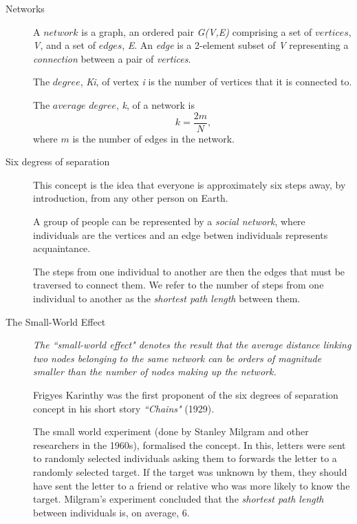 \documentclass[a4paper,11pt,titlepage]{article}
\begin{document}
\begin{description}
 \item [Networks] 

A \(network\) is a graph, an ordered pair \emph{G(V,E)} comprising a set of
\(vertices\), \emph{V}, and a set of \(edges\), \emph{E}. An \emph{edge} is a 
2-element subset of \emph{V} representing a \emph{connection} between a pair of \emph{vertices}. \cite{oconn11}

The \(degree\), \emph{K\lowercase{i}}, of vertex \emph{i} is the number of 
vertices that it is connected to.

The \(average\) \(degree\), \emph{k}, of a network is 
\begin{equation}
\ k =\frac{2m}{N} ,
\end{equation}
 where \(m\) is the number of edges in the network.

\item [Six degress of separation] 

This concept is the idea that everyone is approximately six steps away, by 
introduction, from any other person on Earth. 

A group of people can be represented by a \emph{social network}, where individuals are 
the vertices and an edge betwen individuals represents acquaintance. 

The steps from one individual to another are then the edges that must be 
traversed to connect them. We refer to the number of steps from one 
individual to another as the \emph{shortest path length} between them. \cite{oconn11}

\item [The Small-World Effect]

\emph{The ``small-world effect" denotes the result that the average distance
linking two nodes belonging to the same network can be orders of magnitude
 smaller than the number of nodes making up the network.} \cite{complexAdapt}

Frigyes Karinthy was the first proponent of the six degrees of separation concept
 in his short story \emph{``Chains"} (1929). 

The small world experiment (done by Stanley Milgram and other researchers in the 1960s), formalised the concept. In this, letters were sent to randomly selected individuals
 asking them to forwards the letter to a randomly selected target. If the target
 was unknown by them, they should have sent the letter to a friend or relative
 who was more likely to know the target. Milgram's experiment concluded that the \emph{shortest path length} between individuals is, on average, $6$.


\end{description}
\end{document}
